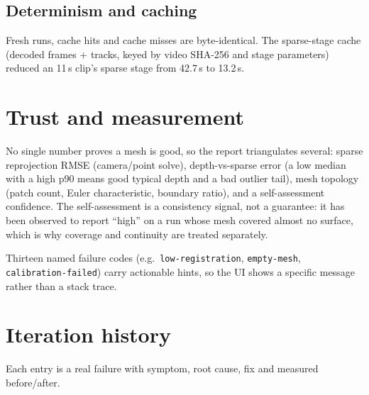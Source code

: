 \documentclass[11pt,a4paper]{article}
\newcommand{\code}[1]{\texttt{#1}}
\begin{document}
\subsection{Determinism and caching}
\label{sec:det}

Fresh runs, cache hits and cache misses are byte-identical. The sparse-stage cache (decoded
frames + tracks, keyed by video SHA-256 and stage parameters) reduced an 11\,s clip's sparse
stage from 42.7\,s to 13.2\,s.

\section{Trust and measurement}
\label{sec:trust}

No single number proves a mesh is good, so the report triangulates several: sparse reprojection
RMSE (camera/point solve), depth-vs-sparse error (a low median with a high p90 means good
typical depth and a bad outlier tail), mesh topology (patch count, Euler characteristic,
boundary ratio), and a self-assessment confidence. The self-assessment is a consistency signal,
not a guarantee: it has been observed to report ``high'' on a run whose mesh covered almost no
surface, which is why coverage and continuity are treated separately.

Thirteen named failure codes (e.g.\ \code{low-registration}, \code{empty-mesh},
\code{calibration-failed}) carry actionable hints, so the UI shows a specific message rather than
a stack trace.

\section{Iteration history}
\label{sec:history}

Each entry is a real failure with symptom, root cause, fix and measured before/after.
\end{document}
